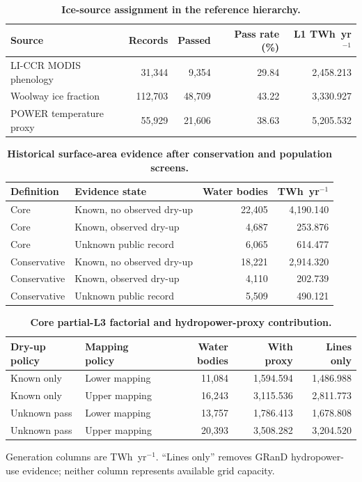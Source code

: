 \begin{table}[H]
\centering
\caption{\textbf{Ice-source assignment in the reference hierarchy.}}
\label{tab:S7}
\begin{tabular}{lrrrr}
\toprule
Source & Records & Passed & Pass rate (\%) & L1 TWh~yr$^{-1}$ \\
\midrule
LI-CCR MODIS phenology & 31{,}344 & 9{,}354 & 29.84 & 2{,}458.213 \\
Woolway ice fraction & 112{,}703 & 48{,}709 & 43.22 & 3{,}330.927 \\
POWER temperature proxy & 55{,}929 & 21{,}606 & 38.63 & 5{,}205.532 \\
\bottomrule
\end{tabular}
\end{table}

\begin{table}[H]
\centering
\caption{\textbf{Historical surface-area evidence after conservation and population screens.}}
\label{tab:S8}
\begin{tabular}{llrr}
\toprule
Definition & Evidence state & Water bodies & TWh~yr$^{-1}$ \\
\midrule
Core & Known, no observed dry-up & 22{,}405 & 4{,}190.140 \\
Core & Known, observed dry-up & 4{,}687 & 253.876 \\
Core & Unknown public record & 6{,}065 & 614.477 \\
Conservative & Known, no observed dry-up & 18{,}221 & 2{,}914.320 \\
Conservative & Known, observed dry-up & 4{,}110 & 202.739 \\
Conservative & Unknown public record & 5{,}509 & 490.121 \\
\bottomrule
\end{tabular}
\end{table}

\begin{table}[H]
\centering
\caption{\textbf{Core partial-L3 factorial and hydropower-proxy contribution.}}
\label{tab:S9}
\begin{tabular}{llrrr}
\toprule
Dry-up policy & Mapping policy & Water bodies & With proxy & Lines only \\
\midrule
Known only & Lower mapping & 11{,}084 & 1{,}594.594 & 1{,}486.988 \\
Known only & Upper mapping & 16{,}243 & 3{,}115.536 & 2{,}811.773 \\
Unknown pass & Lower mapping & 13{,}757 & 1{,}786.413 & 1{,}678.808 \\
Unknown pass & Upper mapping & 20{,}393 & 3{,}508.282 & 3{,}204.520 \\
\bottomrule
\end{tabular}

\raggedright\scriptsize Generation columns are TWh~yr$^{-1}$. ``Lines only'' removes GRanD hydropower-use evidence; neither column represents available grid capacity.
\end{table}

